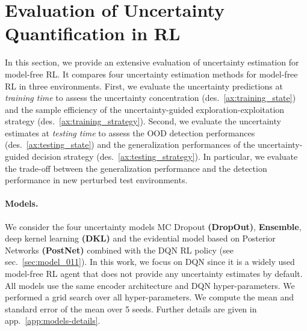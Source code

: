 \vspace{-3mm}
\section{Evaluation of Uncertainty Quantification in RL}
\label{sec:experiments_011}

In this section, we provide an extensive evaluation of uncertainty estimation for model-free RL. It compares four uncertainty estimation methods for model-free RL in three environments. First, we evaluate the uncertainty predictions at \emph{training time} to assess the uncertainty concentration (des.~\ref{ax:training_state}) and the sample efficiency of the uncertainty-guided exploration-exploitation strategy (des.~\ref{ax:training_strategy}). Second, we evaluate the uncertainty estimates at \emph{testing time} to assess the OOD detection performances (des.~\ref{ax:testing_state}) and the generalization performances of the uncertainty-guided decision strategy (des.~\ref{ax:testing_strategy}). In particular, we evaluate the trade-off between the generalization performance and the detection performance in new perturbed test environments.

\paragraph{Models.} We consider the four uncertainty models MC Dropout \textbf{(DropOut)}, \textbf{Ensemble}, deep kernel learning \textbf{(DKL)} and the evidential model based on Posterior Networks \textbf{(PostNet)} combined with the DQN RL policy (see sec.~\ref{sec:model_011}). In this work, we focus on DQN \citep{dqn} since it is a widely used model-free RL agent that does not provide any uncertainty estimates by default. All models use the same encoder architecture and DQN hyper-parameters. We performed a grid search over all hyper-parameters. We compute the mean and standard error of the mean over 5 seeds. Further details are given in app.~\ref{app:models-details}.

